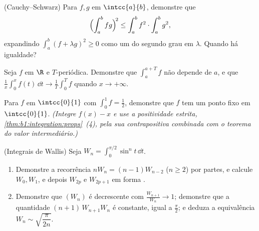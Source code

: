 \begin{exercise}[$\star\star$]\label{exo:b1:integration:5}
(Cauchy--Schwarz) Para $f, g$  em $\intcc{a}{b}$, demonstre que
\[
\Bigl(\int_a^b fg\Bigr)^{\!2} \leq \int_a^b f^2 \cdot \int_a^b g^2 ,
\]
expandindo $\int_a^b (f + \lambda g)^2 \geq 0$ como um  do segundo grau em
$\lambda$. Quando há igualdade?
\end{exercise}

\begin{exercise}[$\star\star$]\label{exo:b1:integration:6}
Seja $f$  em $\R$ e $T$-periódica. Demonstre que $\int_a^{a+T}
f$ não depende de $a$, e que $\frac1x \int_0^x f(t)\,\dd t
\to \frac 1T \int_0^T f$ quando $x \to +\infty$.
\end{exercise}

\begin{exercise}[$\star\star$]\label{exo:b1:integration:7}
Para $f$  em $\intcc{0}{1}$ com $\int_0^1 f = \frac12$,
demonstre que $f$ tem um ponto fixo em $\intcc{0}{1}$. \emph{(Integre
$f(x) - x$ e use a positividade estrita,
\cref{thm:b1:integration:props}~(4), pela sua contrapositiva
combinada com o teorema do valor intermediário.)}
\end{exercise}

\begin{exercise}[$\star\star\star$]\label{exo:b1:integration:8}
(Integrais de Wallis) Seja $W_n = \int_0^{\pi/2} \sin^n t\,\dd t$.
\begin{enumerate}
  \item Demonstre a recorrência $n W_n = (n-1) W_{n-2}$ ($n \geq 2$) por
        partes, e calcule $W_0, W_1$, e depois $W_{2p}$ e $W_{2p+1}$
        em forma .
  \item Demonstre que $(W_n)$ é decrescente com $\frac{W_{n+1}}{W_n}
        \to 1$; demonstre que a quantidade $(n+1)\,W_{n+1} W_n$ é
        constante, igual a $\frac\pi2$; e deduza a equivalência
        $W_n \sim \sqrt{\dfrac{\pi}{2n}}$.
\end{enumerate}
\end{exercise}

